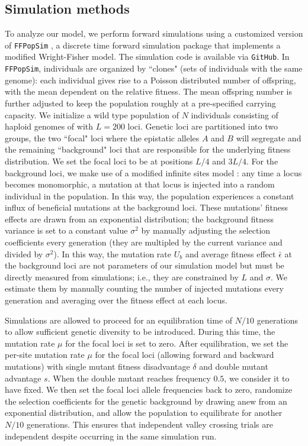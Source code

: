 \documentclass[10pt,twocolumn,twoside]{gsajnl}
\begin{document}
\begin{spacing}{1.5}
\section{Simulation methods}

To analyze our model, we perform forward simulations using a customized version of \texttt{FFPopSim} \citep{zanini_2012}, a discrete time forward simulation package that implements a modified Wright-Fisher model.
The simulation code is available via \texttt{GitHub}.
In \texttt{FFPopSim}, individuals are organized by ``clones" (sets of individuals with the same genome): each individual gives rise to a Poisson distributed number of offspring, with the mean dependent on the relative fitness.
The mean offspring number is further adjusted to keep the population roughly at a pre-specified carrying capacity.
We initialize a wild type population of $N$ individuals consisting of haploid genomes of with $L = 200$ loci.
Genetic loci are partitioned into two groups, the two ``focal" loci where the epistatic alleles $A$ and $B$ will segregate and the remaining ``background" loci that are responsible for the underlying fitness distribution.
We set the focal loci to be at positions $L/4$ and $3L/4$.
For the background loci, we make use of a modified infinite sites model \citep{Kimura:1971,Watterson:1975}: any time a locus becomes monomorphic, a mutation at that locus is injected into a random individual in the population.
In this way, the population experiences a constant influx of beneficial mutations at the background loci.
These mutations' fitness effects are drawn from an exponential distribution; the background fitness variance is set to a constant value $\sigma^2$ by manually adjusting the selection coefficients every generation (they are multipled by the current variance and divided by $\sigma^2$).
In this way, the mutation rate $U_b$ and average fitness effect $\bar{\epsilon}$ at the background loci are not parameters of our simulation model but must be directly measured from simulations; i.e., they are constrained by $L$ and $\sigma$.
We estimate them by manually counting the number of injected mutations every generation and averaging over the fitness effect at each locus.

Simulations are allowed to proceed for an equilibration time of $N/10$ generations to allow sufficient genetic diversity to be introduced.
During this time, the mutation rate $\mu$ for the focal loci is set to zero.
After equilibration, we set the per-site mutation rate $\mu$ for the focal loci (allowing forward and backward mutations) with single mutant fitness disadvantage $\delta$ and double mutant advantage $s$.
When the double mutant reaches frequency $0.5$, we consider it to have fixed.
We then set the focal loci allele frequencies back to zero, randomize the selection coefficients for the genetic background by drawing anew from an exponential distribution, and allow the population to equilibrate for another $N/10$ generations.
This ensures that independent valley crossing trials are independent despite occurring in the same simulation run.


\end{spacing}
\end{document}
